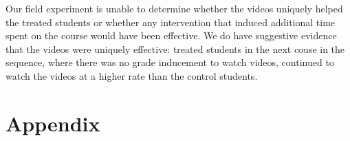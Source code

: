 \documentclass[12pt]{article}
\begin{document}
Our field experiment is unable to determine whether the videos uniquely helped the treated students or whether any intervention that induced additional time spent on the course would have been effective.  We do have suggestive evidence that the videos were uniquely effective:  treated students in the next couse in the sequence, where there was no grade inducement to watch videos, continued to watch the videos at a higher rate than the control students.  


\printbibliography


\section{Appendix}
\end{document}
